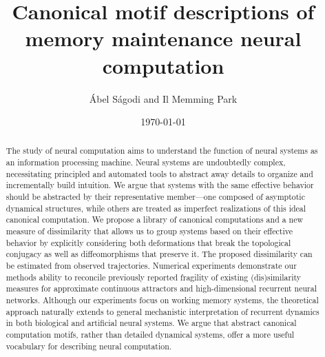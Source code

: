 \documentclass{article}
\title{Canonical motif descriptions of memory maintenance neural computation}
\author{\'Abel S\'agodi and Il Memming Park}
\date{\today}
\theoremstyle{definition} \newtheorem{definition}{Definition}  \newtheorem{example}{Example}
\theoremstyle{remark} \newtheorem{remark}{Remark}
\newcounter{ct}
\begin{document}
\maketitle


\begin{abstract}
The study of neural computation aims to understand the function of neural systems as an information processing machine.
Neural systems are undoubtedly complex, necessitating principled and automated tools to abstract away details to organize and incrementally build intuition.
We argue that systems with the same effective behavior should be abstracted by their representative member---one composed of asymptotic dynamical structures, while others are treated as imperfect realizations of this ideal canonical computation.
We propose a library of canonical computations and a new measure of dissimilarity that allows us to group systems based on their effective behavior by explicitly considering both deformations that break the topological conjugacy as well as diffeomorphisms that preserve it.
The proposed dissimilarity can be estimated from observed trajectories.
Numerical experiments demonstrate our methods ability to reconcile previously reported fragility of existing (dis)similarity measures for approximate continuous attractors and high-dimensional recurrent neural networks.
Although our experiments focus on working memory systems, the theoretical approach naturally extends to general mechanistic interpretation of recurrent dynamics in both biological and artificial neural systems.
We argue that abstract canonical computation motifs, rather than detailed dynamical systems, offer a more useful vocabulary for describing neural computation.
%

\end{abstract}
\end{document}
